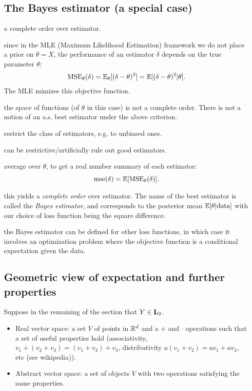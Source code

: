 \documentclass{article}
\begin{document}
\subsection{The Bayes estimator (a special case)}

 a complete order over estimator. 

 since in the MLE (Maximum Likelihood Estimation) framework we do not place a prior on $\theta = X$, the performance of an estimator $\delta$ depends on the true parameter $\theta$:
\[ \text{MSE}_\theta(\delta) = {\mathbb E}_\theta[(\delta - \theta)^2] = {\mathbb E}[(\delta - \theta)^2 | \theta]. \]
The MLE mimizes this objective function.

 the space of functions (of $\theta$ in this case) is not a complete order. There is not a notion of an a.s. best estimator under the above criterion.

 restrict the class of estimators, e.g. to unbiased ones.

 can be restrictive/artificially rule out good estimators. 

 average over $\theta$, to get a real number summary of each estimator:
\[ \text{mse}(\delta) = {\mathbb E}[ \text{MSE}_\theta(\delta) ]. \]

 this yields a \emph{complete order} over estimator. The name of the best estimator is called the \emph{Bayes estimator}, and corresponds to the posterior mean ${\mathbb E}[\theta | \text{data}]$ with our choice of loss function being the square difference. 

 the Bayes estimator can be defined for other loss functions, in which case it involves an optimization problem where the objective function is a conditional expectation given the data.


\subsection{Geometric view of expectation and further properties}

Suppose in the remaining of the section that $Y \in \mathbf L_2$. 

\begin{itemize}
  \item Real vector space: a set $V$ of points in ${\mathbb R}^d$ and a $+$ and $\cdot$ operations such that a set of useful properties hold (associativity, $v_1 + (v_2 + v_3) = (v_1 + v_2) + v_3$, distributivity $a(v_1 + v_2) = a v_1 + a v_2$, etc (see wikipedia)).
  \item Abstract vector space: a set of objects $V$ with two operations satisfying the same properties.
\end{itemize}
\end{document}
